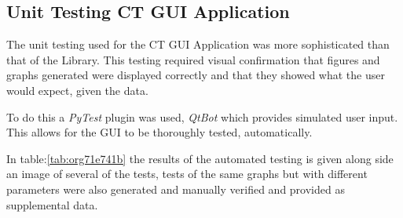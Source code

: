 \documentclass[11pt]{report}
\begin{document}
\clearpage

\subsection{Unit Testing CT GUI Application}
\label{sec:orgae479d8}

The unit testing used for the CT GUI Application was more sophisticated than that of the Library. This testing required visual confirmation that figures and graphs generated were displayed correctly and that they showed what the user would expect, given the data.

To do this a \emph{PyTest} plugin was used, \emph{QtBot} which provides simulated user input. This allows for the GUI to be thoroughly tested, automatically.

In table:\ref{tab:org71e741b} the results of the automated testing is given along side an image of several of the tests, tests of the same graphs but with different parameters were also generated and manually verified and provided as supplemental data.
\end{document}
